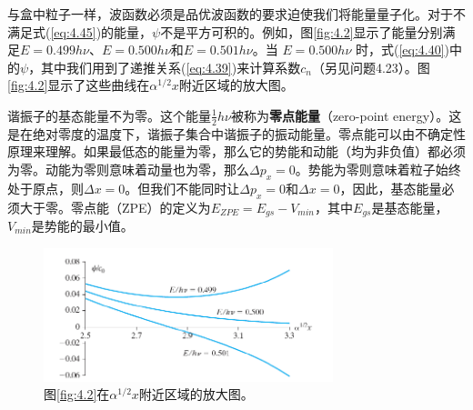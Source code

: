     与盒中粒子一样，波函数必须是品优波函数的要求迫使我们将能量量子化。对于不满足式(\ref{eq:4.45})的能量，$\psi$不是平方可积的。例如，图\ref{fig:4.2}显示了能量分别满足$E = 0.499h\nu$、$E = 0.500h\nu$和$E = 0.501h\nu$。当 $E = 0.500h\nu$ 时，式(\ref{eq:4.40})中的$\psi$，其中我们用到了递推关系(\ref{eq:4.39})来计算系数$c_n$（另见问题4.23）。图\ref{fig:4.2}显示了这些曲线在$\alpha^{1/2}x$附近区域的放大图。

    谐振子的基态能量不为零。这个能量$\frac{1}{2}h\nu$被称为\textbf{零点能量}（zero-point energy）。这是在绝对零度的温度下，谐振子集合中谐振子的振动能量。零点能可以由不确定性原理来理解。如果最低态的能量为零，那么它的势能和动能（均为非负值）都必须为零。动能为零则意味着动量也为零，那么$\Delta p_x = 0$。势能为零则意味着粒子始终处于原点，则$\Delta x = 0$。但我们不能同时让$\Delta p_x = 0$和$\Delta x = 0$，因此，基态能量必须大于零。零点能（ZPE）的定义为$E_{ZPE}=E_{gs} - V_{min}$，其中$E_{gs}$是基态能量，$V_{min}$是势能的最小值。
    \begin{figure}[h!]
        \centering
        \includegraphics[width=0.75\textwidth]{Figures/4.3.png}
        \caption{
            图\ref{fig:4.2}在$\alpha^{1/2}x$附近区域的放大图。
        }
        \label{fig:4.3}
    \end{figure}

